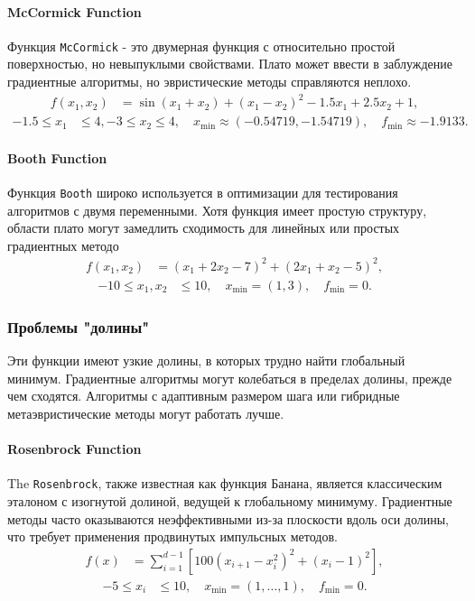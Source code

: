\documentclass[10pt]{article}
\begin{document}
\paragraph{McCormick Function}
Функция \texttt{McCormick} - это двумерная функция с относительно простой поверхностью, но невыпуклыми свойствами. Плато может ввести в заблуждение градиентные алгоритмы, но эвристические методы справляются неплохо.
\begin{align}
    f(x_1, x_2) &= \sin(x_1 + x_2) + (x_1 - x_2)^2 - 1.5x_1 + 2.5x_2 + 1,
    \label{eq:mccormick}
\end{align}
\begin{align*}
    -1.5 \leq x_1 &\leq 4, -3 \leq x_2 \leq 4, \quad x_{\text{min}} \approx (-0.54719, -1.54719), \quad f_{\text{min}} \approx -1.9133.
\end{align*}

\paragraph{Booth Function}
Функция \texttt{Booth} широко используется в оптимизации для тестирования алгоритмов с двумя переменными. Хотя функция имеет простую структуру, области плато могут замедлить сходимость для линейных или простых градиентных методо
\begin{align}
    f(x_1, x_2) &= (x_1 + 2x_2 - 7)^2 + (2x_1 + x_2 - 5)^2,
    \label{eq:booth}
\end{align}
\begin{align*}
    -10 \leq x_1, x_2 &\leq 10, \quad x_{\text{min}} = (1, 3), \quad f_{\text{min}} = 0.
\end{align*}

\subsubsection{Проблемы "долины"}
Эти функции имеют узкие долины, в которых трудно найти глобальный минимум. Градиентные алгоритмы могут колебаться в пределах долины, прежде чем сходятся. Алгоритмы с адаптивным размером шага или гибридные метаэвристические методы могут работать лучше.

\paragraph{Rosenbrock Function}
The \texttt{Rosenbrock}, также известная как функция Банана, является классическим эталоном с изогнутой долиной, ведущей к глобальному минимуму. Градиентные методы часто оказываются неэффективными из-за плоскости вдоль оси долины, что требует применения продвинутых импульсных методов.
\begin{align}
    f(x) &= \sum_{i=1}^{d-1} \left[100(x_{i+1} - x_i^2)^2 + (x_i - 1)^2\right],
    \label{eq:rosenbrock}
\end{align}
\begin{align*}
    -5 \leq x_i &\leq 10, \quad x_{\text{min}} = (1, \ldots, 1), \quad f_{\text{min}} = 0.
\end{align*}
\end{document}
